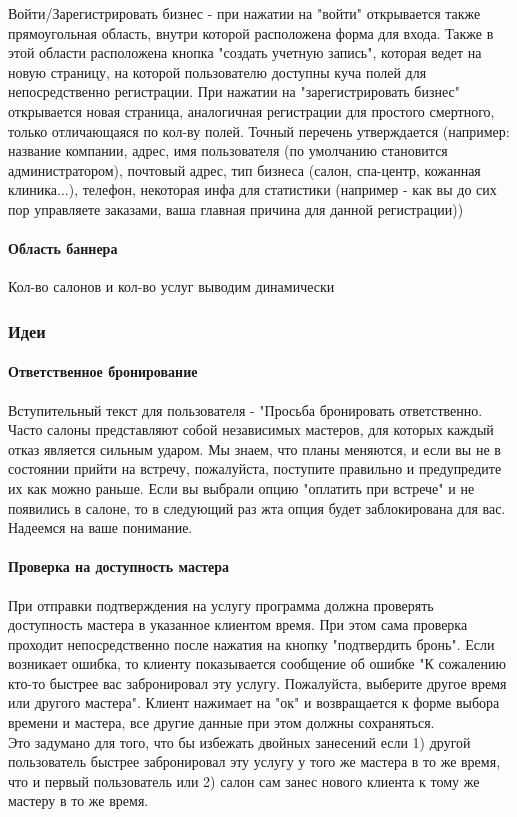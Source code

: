 \documentclass[DIV=calc, paper=a4, fontsize=11pt]{scrartcl} %
\begin{document}
Войти/Зарегистрировать бизнес - при нажатии на "войти" открывается также прямоугольная область, внутри которой расположена форма для входа. Также в этой области расположена кнопка "создать учетную запись", которая ведет на новую страницу, на которой пользователю доступны куча полей для непосредственно регистрации.
При нажатии на "зарегистрировать бизнес" открывается новая страница, аналогичная регистрации для простого смертного, только отличающаяся по кол-ву полей. Точный перечень утверждается (например: название компании, адрес, имя пользователя (по умолчанию становится администратором), почтовый адрес, тип бизнеса (салон, спа-центр, кожанная клиника...), телефон, некоторая инфа для статистики (например - как вы до сих пор управляете заказами, ваша главная причина для данной регистрации))

\paragraph{Область баннера}
Кол-во салонов и кол-во услуг выводим динамически

\subsubsection{Идеи}

\paragraph{Ответственное бронирование}
Вступительный текст для пользователя - "Просьба бронировать ответственно. Часто салоны представляют собой независимых мастеров, для которых каждый отказ является сильным ударом. Мы знаем, что планы меняются, и если вы не в состоянии прийти на встречу, пожалуйста, поступите правильно и предупредите их как можно раньше. Если вы выбрали опцию "оплатить при встрече" и не появились в салоне, то в следующий раз жта опция будет заблокирована для вас. Надеемся на ваше понимание.

\paragraph{Проверка на доступность мастера}
При отправки подтверждения на услугу программа должна проверять доступность мастера в указанное клиентом время. При этом сама проверка проходит непосредственно после нажатия на кнопку "подтвердить бронь". Если возникает ошибка, то клиенту показывается сообщение об ошибке "К сожалению кто-то быстрее вас забронировал эту услугу. Пожалуйста, выберите другое время или другого мастера". Клиент нажимает на "ок" и возвращается к форме выбора времени и мастера, все другие данные при этом должны сохраняться.
\\[0.5cm]
Это задумано для того, что бы избежать двойных занесений если 1) другой пользователь быстрее забронировал эту услугу у того же мастера в то же время, что и первый пользователь или 2) салон сам занес нового клиента к тому же мастеру в то же время.
\end{document}
